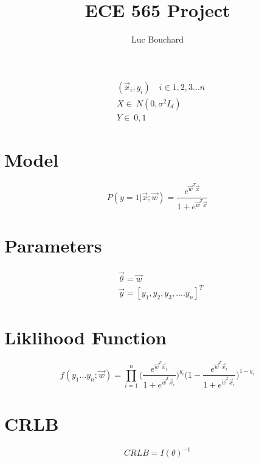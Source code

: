 \documentclass{article}
\title{ECE 565 Project}
\author{Luc Bouchard}
\begin{document}
\maketitle


\begin{equation}    
\begin{aligned}
    &(\vec{x}_i, y_i) \quad i \in 1,2,3...n \\
    &X \in ~ N(0, \sigma^2I_d) \\
    &Y \in ~ {0, 1}
\end{aligned}
\end{equation}

\section{Model}

\begin{equation}
    P(y = 1|\vec{x}; \vec{w}) = \frac{e^{\vec{w}^T\vec{x}}}{1 + e^{\vec{w}^T\vec{x}}}
\end{equation}

\section{Parameters}

\begin{equation}    
    \begin{aligned}
        &\vec{\theta} = \vec{w} \\
        &\vec{y} = [y_1, y_2, y_3, .... y_n]^T
    \end{aligned}
\end{equation}

\section{Liklihood Function}

\begin{equation}
    f(y_1 ... y_n; \vec{w}) = \prod_{i = 1}^{n} \Big(\frac{e^{\vec{w}^T\vec{x}_i}}{1 + e^{\vec{w}^T\vec{x}_i}}\Big)^{y_i} \Big(1 - \frac{e^{\vec{w}^T\vec{x}_i}}{1 + e^{\vec{w}^T\vec{x}_i}}\Big)^{1 - y_i}
\end{equation}

\section{CRLB}

\begin{equation}
    CRLB = I(\theta)^{-1}
\end{equation}
\end{document}
